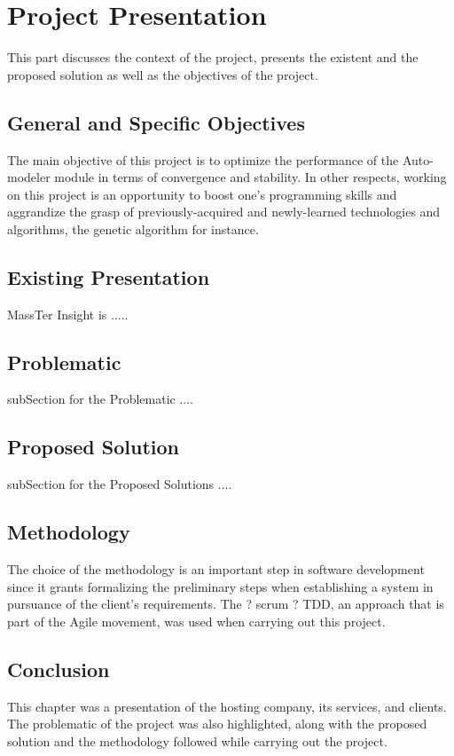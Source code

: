 \documentclass[12pt]{article}
\begin{document}
	\section{Project Presentation}
	This part discusses the context of the project, presents the existent and the proposed solution as well as the objectives of the project.
	\subsection{General and Specific Objectives}
	The main objective of this project is to optimize the performance of the Auto-modeler module in terms of convergence and stability. In other respects, working on this project is an opportunity to boost one’s programming skills and aggrandize the grasp of previously-acquired and newly-learned technologies and algorithms, the genetic algorithm for instance.
	\subsection{Existing Presentation}
	MassTer Insight is .....
	\subsection{Problematic}
	subSection for the Problematic ....
	\subsection{Proposed Solution}
	subSection for the Proposed Solutions ....
	\subsection{Methodology}
	The choice of the methodology is an important step in software development since it grants formalizing the preliminary steps when establishing a system in pursuance of the client’s requirements.
	The  ? scrum ? TDD, an approach that is part of the Agile movement, was used when carrying out this project.
	\subsection{Conclusion}
	This chapter was a presentation of the hosting company, its services, and clients. The problematic of the project was also highlighted, along with the proposed solution and the methodology followed while carrying out the project.
	
\end{document}
